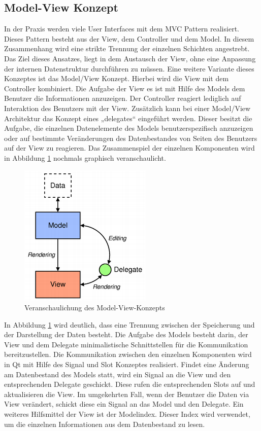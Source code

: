 \cite{vorteileQt1} \cite{vorteileQt2} \cite{vorteileQt3}

\subsection{Model-View Konzept}

In der Praxis werden viele User Interfaces mit dem MVC Pattern realisiert. Dieses Pattern besteht aus der View, dem Controller und dem Model. In diesem Zusammenhang wird eine strikte Trennung der einzelnen Schichten angestrebt. Das Ziel dieses Ansatzes, liegt in dem Austausch der View, ohne eine Anpassung der internen Datenstruktur durchführen zu müssen. Eine weitere Variante dieses Konzeptes ist das Model/View Konzept. Hierbei wird die View mit dem Controller kombiniert. Die Aufgabe der View es ist mit Hilfe des Models dem Benutzer die Informationen anzuzeigen. Der Controller reagiert lediglich auf Interaktion des Benutzers mit der View. Zusätzlich kann bei einer Model/View Architektur das Konzept eines „delegates“ eingeführt werden. Dieser besitzt die Aufgabe, die einzelnen Datenelemente des Models benutzerspezifisch anzuzeigen oder auf bestimmte Veränderungen des Datenbestandes von Seiten des Benutzers auf der View zu reagieren. Das Zusammenspiel der einzelnen Komponenten wird in Abbildung \ref{pic:ModelView} nochmals graphisch veranschaulicht.

\begin{figure}[H]
	\centering
	\includegraphics[scale=1.0]{images/ModelView.png}
	\caption{Veranschaulichung des Model-View-Konzepts}
	\label{pic:ModelView}
\end{figure}

In Abbildung \ref{pic:ModelView} wird deutlich, dass eine Trennung zwischen der Speicherung und der Darstellung der Daten besteht. Die Aufgabe des Models besteht darin, der View und dem Delegate minimalistische Schnittstellen für die Kommunikation bereitzustellen. Die Kommunikation zwischen den einzelnen Komponenten wird in Qt mit Hilfe des Signal und Slot Konzeptes realisiert. Findet eine Änderung am Datenbestand des Models statt, wird ein Signal an die View und den entsprechenden Delegate geschickt. Diese rufen die entsprechenden Slots auf und aktualisieren die View. Im umgekehrten Fall, wenn der Benutzer die Daten via View verändert, schickt diese ein Signal an das Model und den Delegate. Ein weiteres Hilfsmittel der View ist der Modelindex. Dieser Index wird verwendet, um die einzelnen Informationen aus dem Datenbestand zu lesen. \\

